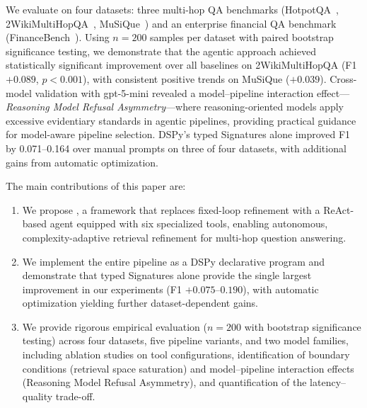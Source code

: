We evaluate \ours{} on four datasets: three multi-hop QA benchmarks (HotpotQA~\cite{yang2018hotpotqa}, 2WikiMultiHopQA~\cite{ho2020wiki2multi}, MuSiQue~\cite{trivedi2022musique}) and an enterprise financial QA benchmark (FinanceBench~\cite{financebench2023}).
Using $n = 200$ samples per dataset with paired bootstrap significance testing, we demonstrate that the agentic approach achieved statistically significant improvement over all baselines on 2WikiMultiHopQA (F1 $+0.089$, $p < 0.001$), with consistent positive trends on MuSiQue ($+0.039$).
Cross-model validation with gpt-5-mini revealed a model--pipeline interaction effect---\emph{Reasoning Model Refusal Asymmetry}---where reasoning-oriented models apply excessive evidentiary standards in agentic pipelines, providing practical guidance for model-aware pipeline selection.
DSPy's typed Signatures alone improved F1 by 0.071--0.164 over manual prompts on three of four datasets, with additional gains from automatic optimization.

The main contributions of this paper are:
\begin{enumerate}
    \item We propose \ours{}, a framework that replaces fixed-loop refinement with a ReAct-based agent equipped with six specialized tools, enabling autonomous, complexity-adaptive retrieval refinement for multi-hop question answering.

    \item We implement the entire pipeline as a DSPy declarative program and demonstrate that typed Signatures alone provide the single largest improvement in our experiments (F1 $+0.075$--$0.190$), with automatic optimization yielding further dataset-dependent gains.

    \item We provide rigorous empirical evaluation ($n = 200$ with bootstrap significance testing) across four datasets, five pipeline variants, and two model families, including ablation studies on tool configurations, identification of boundary conditions (retrieval space saturation) and model--pipeline interaction effects (Reasoning Model Refusal Asymmetry), and quantification of the latency--quality trade-off.
\end{enumerate}
